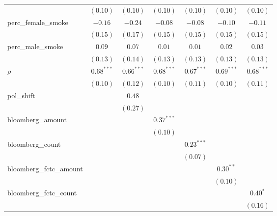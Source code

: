 \begin{table}[!h]
\begin{center}
\begin{tabular}{l c c c c c c }
                        & $(0.10)$     & $(0.10)$     & $(0.10)$     & $(0.10)$     & $(0.10)$     & $(0.10)$     \\
perc\_female\_smoke     & $-0.16$      & $-0.24$      & $-0.08$      & $-0.08$      & $-0.10$      & $-0.11$      \\
                        & $(0.15)$     & $(0.17)$     & $(0.15)$     & $(0.15)$     & $(0.15)$     & $(0.15)$     \\
perc\_male\_smoke       & $0.09$       & $0.07$       & $0.01$       & $0.01$       & $0.02$       & $0.03$       \\
                        & $(0.13)$     & $(0.14)$     & $(0.13)$     & $(0.13)$     & $(0.13)$     & $(0.13)$     \\
$\rho$                  & $0.68^{***}$ & $0.66^{***}$ & $0.68^{***}$ & $0.67^{***}$ & $0.69^{***}$ & $0.68^{***}$ \\
                        & $(0.10)$     & $(0.12)$     & $(0.10)$     & $(0.11)$     & $(0.10)$     & $(0.11)$     \\
pol\_shift              &              & $0.48$       &              &              &              &              \\
                        &              & $(0.27)$     &              &              &              &              \\
bloomberg\_amount       &              &              & $0.37^{***}$ &              &              &              \\
                        &              &              & $(0.10)$     &              &              &              \\
bloomberg\_count        &              &              &              & $0.23^{***}$ &              &              \\
                        &              &              &              & $(0.07)$     &              &              \\
bloomberg\_fctc\_amount &              &              &              &              & $0.30^{**}$  &              \\
                        &              &              &              &              & $(0.10)$     &              \\
bloomberg\_fctc\_count  &              &              &              &              &              & $0.40^{*}$   \\
                        &              &              &              &              &              & $(0.16)$     \\

\end{tabular}
\end{center}
\end{table}
